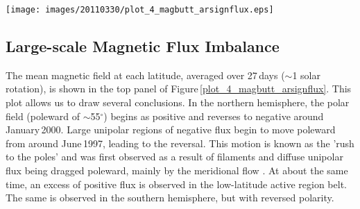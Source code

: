 \documentclass[namedreferences]{solarphysics}
\newcommand{\degr}{\ensuremath{^\circ}}
\begin{document}
\begin{article}




\begin{figure*}[!ht]
\texttt{[image: images/20110330/plot\_4\_magbutt\_arsignflux.eps]}
\caption{\emph{Top}: Magnetic butterfly diagram ($1^{\circ}$ latitude and 27\,day time binning) of mean signed magnetic field. The red and blue arrows correspond to the times of high-latitude $\Phi_{\langle B \rangle,\mathrm{NET}}$ peaks indicated in Figure\,\ref{plot_5_fluximbal_hi_lo}. \emph{Bottom}: Total detected magnetic feature $\Phi_{\mathrm{NET}}$ with binning the same as the \emph{top} panel.}
\label{plot_4_magbutt_arsignflux}
\end{figure*}


\subsection{Large-scale Magnetic Flux Imbalance}\label{subsect_imbharm}


The mean magnetic field at each latitude, averaged over 27\,days ($\sim$1 solar rotation), is shown in the top panel of Figure\,\ref{plot_4_magbutt_arsignflux}. This plot allows us to draw several conclusions. In the northern hemisphere, the polar field (poleward of $\sim$55\degr) begins as positive and reverses to negative around January\,2000. Large unipolar regions of negative flux begin to move poleward from around June\,1997, leading to the reversal. This motion is known as the 'rush to the poles' and was first observed as a result of filaments \citep{Lockyer:1931,Hyder:1965} and diffuse unipolar flux \citep{Bumba:1965} being dragged poleward, mainly by the meridional flow \citep[][and references therein]{Sheeley:2005}. At about the same time, an excess of positive flux is observed in the low-latitude active region belt. 
The same is observed in the southern hemisphere, but with reversed polarity.


\end{article}
\end{document}

